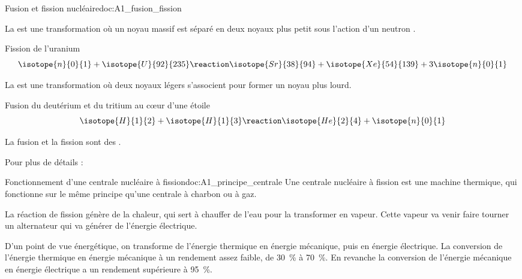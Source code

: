 \begin{doc}{Fusion et fission nucléaire}{doc:A1_fusion_fission}
  \begin{importants}
    La  est une transformation où un noyau massif est séparé en deux noyaux plus petit sous l'action d'un neutron .
  \end{importants}
  \exemple Fission de l'uranium 
  \begin{equation*} 
    \isotope{n}{0}{1} + \isotope{U}{92}{235} \reaction \isotope{Sr}{38}{94} + \isotope{Xe}{54}{139} + 3\isotope{n}{0}{1}
  \end{equation*}
  
  \begin{importants}
    La  est une transformation où deux noyaux légers s'associent pour former un noyau plus lourd.
  \end{importants}
  \exemple Fusion du deutérium et du tritium au c\oe{}ur d'une étoile
  \begin{equation*}
    \isotope{H}{1}{2} + \isotope{H}{1}{3} \reaction \isotope{He}{2}{4} + \isotope{n}{0}{1}
  \end{equation*}
  
  \phantom{b}\vspace*{-12pt}
  
  \begin{importants}
    La fusion et la fission sont des .
  \end{importants}

  Pour plus de détails :
\end{doc}

\begin{doc}{Fonctionnement d'une centrale nucléaire à fission}{doc:A1_principe_centrale}
  Une centrale nucléaire à fission est une machine thermique, qui fonctionne sur le même principe qu'une centrale à charbon ou à gaz.

  La réaction de fission génère de la chaleur, qui sert à chauffer de l'eau pour la transformer en vapeur.
  Cette vapeur va venir faire tourner un alternateur qui va générer de l'énergie électrique.
  \bigskip

  D'un point de vue énergétique, on transforme de l'énergie thermique en énergie mécanique, puis en énergie électrique.
  La conversion de l'énergie thermique en énergie mécanique à un rendement assez faible, de \qty{30}{\percent} à \qty{70}{\percent}.
  En revanche la conversion de l'énergie mécanique en énergie électrique a un rendement supérieure à \qty{95}{\percent}.
\end{doc}


